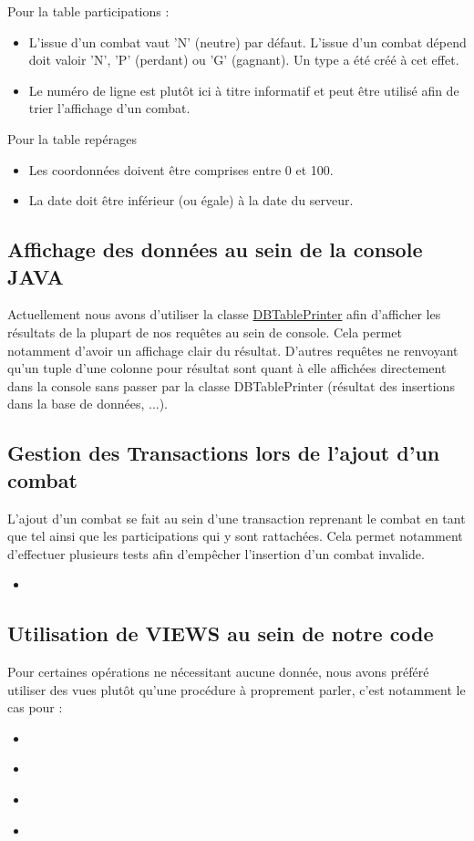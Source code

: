 \documentclass{article}[12pt]
\newcommand{\SQLcode}[2]{
	\begin{itemize}
		\item[]
	\end{itemize}
}
\newcommand{\Javacode}[2]{
	\begin{itemize}
    	\item[]
	\end{itemize}
}
\begin{document}
	Pour la table participations :
	\begin{itemize}
		\item L'issue d'un combat vaut 'N' (neutre) par défaut. L'issue d'un combat dépend doit valoir 'N', 'P' (perdant) ou 'G' (gagnant). Un type a été créé à cet effet.
		\item Le numéro de ligne est plutôt ici à titre informatif et peut être utilisé afin de trier l'affichage d'un combat.
	\end{itemize}
	Pour la table repérages
	\begin{itemize}
		\item Les coordonnées doivent être comprises entre 0 et 100.
		\item La date doit être inférieur (ou égale) à la date du serveur.
	\end{itemize}
	\subsection{Affichage des données au sein de la console JAVA}
	Actuellement nous avons d'utiliser la classe \href{https://github.com/htorun/dbtableprinter}{DBTablePrinter} afin d'afficher les résultats de la plupart de nos requêtes au sein de console. Cela permet notamment d'avoir un affichage clair du résultat. D'autres requêtes ne renvoyant qu'un tuple d'une colonne pour résultat sont quant à elle affichées directement dans la console sans passer par la classe DBTablePrinter (résultat des insertions dans la base de données, ...).
    \subsection{Gestion des Transactions lors de l'ajout d'un combat}
    L'ajout d'un combat se fait au sein d'une transaction reprenant le combat en tant que tel ainsi que les participations qui y sont rattachées. Cela permet notamment d'effectuer plusieurs tests afin d'empêcher l'insertion d'un combat invalide.
   	\Javacode{transaction}{Utilisation de transaction au sein de notre application}
    \subsection{Utilisation de VIEWS au sein de notre code}
    Pour certaines opérations ne nécessitant aucune donnée, nous avons préféré utiliser des vues plutôt qu'une procédure à proprement parler, c'est notamment le cas pour : 
    \SQLcode{perte_visibilite}{Obtenir les informations sur tous les héros n'ayant pas été aperçu depuis plus de dix jours}
    \SQLcode{zone_conflit}{Lister les zones potentielles de conflit}
    \SQLcode{classement_victoires}{Obtenir un classement des héros en fonction de leurs victoires}
    \SQLcode{classement_defaites}{Obtenir un classement des héros en fonction de leurs défaites}
    
\end{document}
